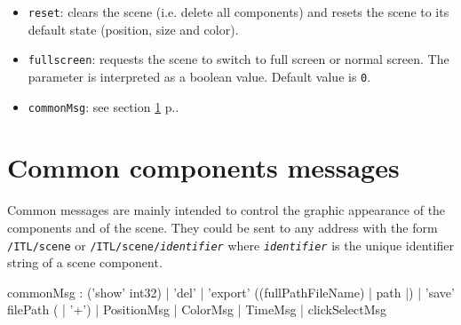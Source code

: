 \documentclass[a4paper,twoside]{report}
\newcommand{\toplevel}[1]	{\chapter{#1}}
\newcommand{\fullref}[1]	{\ref{#1} p.\pageref{#1}}
\newcommand{\OSC}[1]		{\texttt{#1}}
\newcommand{\values}[1]	{\texttt{#1}}
\begin{document}
\begin{itemize}
\item \OSC{reset}: clears the scene (i.e. delete all components) and resets the scene to its default state (position, size and color).
\item \OSC{fullscreen}: requests the scene to switch to full screen or normal screen.  The parameter is interpreted as a boolean value. Default value is \values{0}.
\item \OSC{commonMsg}: see section \fullref{common}.
\end{itemize}


\toplevel{Common components messages}
\label{common}
Common messages are mainly intended to control the graphic appearance of the components and  of the scene.
They could be sent to any address with the form \OSC{/ITL/scene} or \OSC{/ITL/scene/\textit{identifier}} where \OSC{\textit{identifier}} is the unique identifier string of a scene component.
\begin{rail}
commonMsg :  ('show' int32)
			| 'del'
			| 'export' ((fullPathFileName) | path |)
			| 'save' filePath ( | '+')
			| PositionMsg
			| ColorMsg
			| TimeMsg
			| clickSelectMsg
\end{rail}
\end{document}
